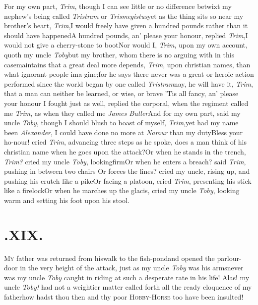 \documentclass{article}
\begin{document}
\tsh For my own part, \textit{Trim}, though I can see
little or no difference betwixt my nephew’s being called \textit{Tristram} or
\textit{Trismegistus}\tsk yet as the thing sits so near my
brother’s heart, \textit{Trim},\tsh I would freely have
given a hundred pounds rather than it should have
happened\tsh A hundred pounds, an’ please your
honour,  replied \textit{Trim},\tsk I would not give a cherry-stone
to boot\tsh Nor would I, \textit{Trim}, upon my own
account, quoth my uncle \textit{Toby}\tsh but my brother,
whom there is no arguing with in this case\tsk maintains that a
great deal more depends, \textit{Trim}, upon christian names, than
what ignorant people ima-\pb gine;\tsh for he says there never
was a great or heroic action performed since the world began by one
called \textit{Tristram}\break\tsk nay, he will have it, \textit{Trim},
that a man can neither be learned, or wise, or
brave\break
\tsk ’Tis all fancy, an’ please your honour\break
\tsk I fought just as well, replied the corporal, when the
regiment called me \textit{Trim}, as when they called me \textit{James
Butler}\tsh\break And for my own part, said my uncle\break
\textit{Toby}, though I should blush to boast of myself,
\textit{Trim},\tsk yet had my name been \textit{Alexander}, I could have done no more at
\textit{Namur} than my duty\tsk Bless your ho-\break nour! cried
\textit{Trim}, advancing three steps as he spoke, does a man think of
his christian name when he goes upon the attack?\tsk Or
when he stands in the trench, \textit{Trim?} cried my uncle
\textit{Toby}, looking\break firm\tsk Or when he enters a breach?
said \textit{Trim}, pushing in between two chairs\tsk\pb
\tsk Or forces the lines? cried my uncle, rising up, and pushing his crutch
like a pike\tsk Or facing a platoon, cried \textit{Trim},
presenting his stick like a firelock\tsk Or when he
marches up the glacis, cried my uncle \textit{Toby}, looking warm and
setting his foot upon his stool.\tsh

\vspace\parskip

\section{.\enspace XIX.}

\lettrine{M}{y} father was returned from his\break walk
to the fish-pond\tsk and open\-ed the parlour-door in the
very height of the attack, just as my uncle \textit{Toby} was
 his
arms\tsk never was my uncle \textit{Toby} caught in riding at such a
desperate rate in his life! Alas! my uncle \textit{Toby!} had not a
weightier matter called forth all the ready eloquence of my
father\tsk how hadst\pb
thou then and thy poor
\textsc{Hobby-Horse} too have been insulted!
\end{document}
